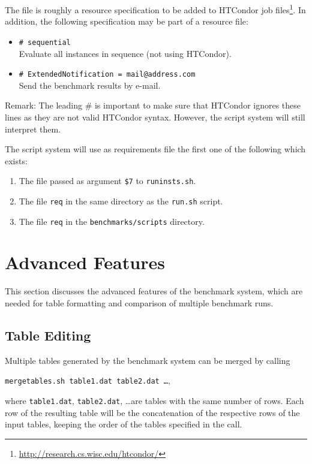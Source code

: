 \documentclass[a4paper]{article}
\begin{document}
			The file is roughly a resource specification to be added to
			HTCondor job files\footnote{\url{http://research.cs.wisc.edu/htcondor/}}.
			In addition, the following specification may be part of a resource file:
			\begin{itemize}
				\item {\tt \# sequential} \\
					Evaluate all instances in sequence (not using HTCondor).
				\item {\tt \# ExtendedNotification = mail@address.com} \\
					 Send the benchmark results by e-mail. 
			\end{itemize}
			Remark: The leading {\#} is important to make sure that HTCondor ignores these lines
			as they are not valid HTCondor syntax. However, the script system will still interpret them.
	
			The script system will use as requirements file the first one of the following which exists:
			\begin{enumerate}
				\item The file passed as argument {\tt \$7} to {\tt runinsts.sh}.
				\item The file {\tt req} in the same directory as the {\tt run.sh} script.
				\item The file {\tt req} in the {\tt benchmarks/scripts} directory.
			\end{enumerate}

	\section{Advanced Features}
	\label{sec:advanced}

		This section discusses the advanced features of the benchmark system,
		which are needed for table formatting and comparison of multiple benchmark runs.

		\subsection{Table Editing}

			Multiple tables generated by the benchmark system can be merged by calling
			\begin{center}
				{\tt mergetables.sh table1.dat table2.dat \ldots},
			\end{center}
			where {\tt table1.dat}, {\tt table2.dat}, \ldots are tables
			with the same number of rows. Each row of the resulting table will be the
			concatenation of the respective rows of the input tables, keeping the order of the tables
			specified in the call.
\end{document}
